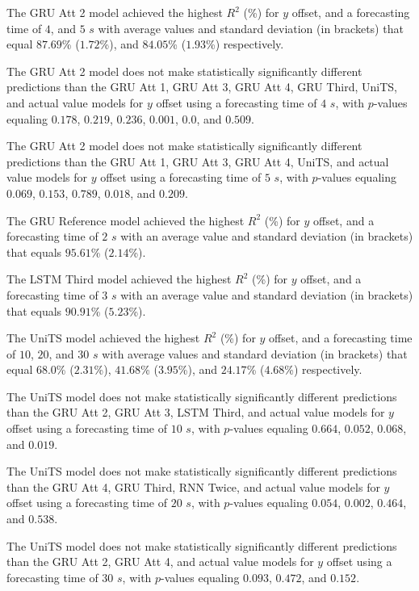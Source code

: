 The GRU Att 2 model achieved the highest $R^{2}$ (\%) for $y$ offset, and a forecasting time of $4$, and $5$ $s$ with average values and standard deviation (in brackets) that equal $87.69$\% ($1.72$\%), and $84.05$\% ($1.93$\%) respectively.

The GRU Att 2 model does not make statistically significantly different predictions than the GRU Att 1, GRU Att 3, GRU Att 4, GRU Third, UniTS, and actual value models for $y$ offset using a forecasting time of $4$ $s$, with $p$-values equaling $0.178$, $0.219$, $0.236$, $0.001$, $0.0$, and $0.509$.

The GRU Att 2 model does not make statistically significantly different predictions than the GRU Att 1, GRU Att 3, GRU Att 4, UniTS, and actual value models for $y$ offset using a forecasting time of $5$ $s$, with $p$-values equaling $0.069$, $0.153$, $0.789$, $0.018$, and $0.209$.

The GRU Reference model achieved the highest $R^{2}$ (\%) for $y$ offset, and a forecasting time of $2$ $s$ with an average value and standard deviation (in brackets) that equals $95.61$\% ($2.14$\%).

The LSTM Third model achieved the highest $R^{2}$ (\%) for $y$ offset, and a forecasting time of $3$ $s$ with an average value and standard deviation (in brackets) that equals $90.91$\% ($5.23$\%).

The UniTS model achieved the highest $R^{2}$ (\%) for $y$ offset, and a forecasting time of $10$, $20$, and $30$ $s$ with average values and standard deviation (in brackets) that equal $68.0$\% ($2.31$\%), $41.68$\% ($3.95$\%), and $24.17$\% ($4.68$\%) respectively.

The UniTS model does not make statistically significantly different predictions than the GRU Att 2, GRU Att 3, LSTM Third, and actual value models for $y$ offset using a forecasting time of $10$ $s$, with $p$-values equaling $0.664$, $0.052$, $0.068$, and $0.019$.

The UniTS model does not make statistically significantly different predictions than the GRU Att 4, GRU Third, RNN Twice, and actual value models for $y$ offset using a forecasting time of $20$ $s$, with $p$-values equaling $0.054$, $0.002$, $0.464$, and $0.538$.

The UniTS model does not make statistically significantly different predictions than the GRU Att 2, GRU Att 4, and actual value models for $y$ offset using a forecasting time of $30$ $s$, with $p$-values equaling $0.093$, $0.472$, and $0.152$.

